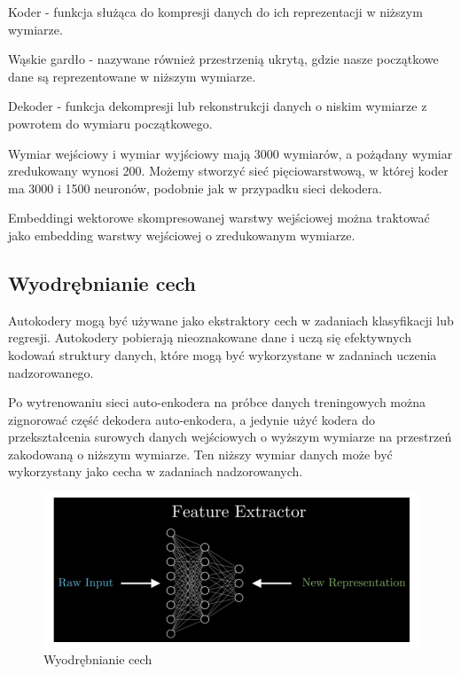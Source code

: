\documentclass[12pt]{mwbk}
\theoremstyle{plain}
\theoremstyle{definition}
\theoremstyle{remark}
\newcommand\zrodlo[1]{\par\vspace{-3mm}{\small\textit{Źródło: }#1 }}
\begin{document}
Koder - funkcja służąca do kompresji danych do ich reprezentacji w niższym wymiarze.

Wąskie gardło - nazywane również przestrzenią ukrytą, gdzie nasze początkowe dane są reprezentowane w niższym wymiarze.

Dekoder - funkcja dekompresji lub rekonstrukcji danych o niskim wymiarze z powrotem do wymiaru początkowego.

Wymiar wejściowy i wymiar wyjściowy mają 3000 wymiarów, a pożądany wymiar zredukowany wynosi 200. Możemy stworzyć sieć pięciowarstwową, w której koder ma 3000 i 1500 neuronów, podobnie jak w przypadku sieci dekodera.

Embeddingi wektorowe skompresowanej warstwy wejściowej można traktować jako embedding warstwy wejściowej o zredukowanym wymiarze.

\subsection{Wyodrębnianie cech}

Autokodery mogą być używane jako ekstraktory cech w zadaniach klasyfikacji lub regresji. Autokodery pobierają nieoznakowane dane i uczą się efektywnych kodowań struktury danych, które mogą być wykorzystane w zadaniach uczenia nadzorowanego.

Po wytrenowaniu sieci auto-enkodera na próbce danych treningowych można zignorować część dekodera auto-enkodera, a jedynie użyć kodera do przekształcenia surowych danych wejściowych o wyższym wymiarze na przestrzeń zakodowaną o niższym wymiarze. Ten niższy wymiar danych może być wykorzystany jako cecha w zadaniach nadzorowanych.

\begin{figure}[!h]
	\centering
	\includegraphics[width=\linewidth]{rys/feature_extractor.png}
	\caption{Wyodrębnianie cech}
	\zrodlo{towards data science}
	\label{fig:feature-extractor}
\end{figure}
\end{document}
